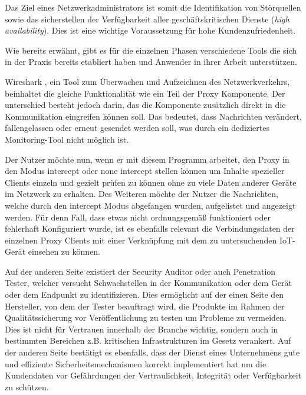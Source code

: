     Das Ziel eines Netzwerkadministrators ist somit die Identifikation von Störquellen sowie das sicherstellen der Verfügbarkeit aller geschäftskritischen Dienste (\emph{high availability}). Dies ist eine wichtige Voraussetzung für hohe Kundenzufriedenheit.
    
    Wie bereits erwähnt, gibt es für die einzelnen Phasen verschiedene Tools die sich in der Praxis bereits etabliert haben und Anwender in ihrer Arbeit unterstützen.
    
    Wireshark \cite{SandersChris2017Ppa}, ein Tool zum Überwachen und Aufzeichnen des Netzwerkverkehrs, beinhaltet die gleiche Funktionalität wie ein Teil der Proxy Komponente. Der unterschied besteht jedoch darin, das die Komponente zusätzlich direkt in die Kommunikation eingreifen können soll. Das bedeutet, dass Nachrichten verändert, fallengelassen oder erneut gesendet werden soll, was durch ein dediziertes Monitoring-Tool nicht möglich ist.
    
    Der Nutzer möchte nun, wenn er mit diesem Programm arbeitet, den Proxy in den Modus \glqq intercept\grqq{} oder \glqq none intercept\grqq{} stellen können um Inhalte spezieller Clients einzeln und gezielt prüfen zu können ohne zu viele Daten anderer Geräte im Netzwerk zu erhalten.
    Des Weiteren möchte der Nutzer die Nachrichten, welche durch den \glqq intercept\grqq{} Modus abgefangen wurden, aufgelistet und angezeigt werden.
    Für denn Fall, dass etwas nicht ordnungsgemäß funktioniert oder fehlerhaft Konfiguriert wurde, ist es ebenfalls relevant die Verbindungsdaten der einzelnen Proxy Clients mit einer Verknüpfung mit dem zu untersuchenden \ac{IoT}-Gerät einsehen zu können.
    
    Auf der anderen Seite existiert der Security Auditor oder auch Penetration Tester, welcher versucht Schwachstellen in der Kommunikation oder dem Gerät oder dem Endpunkt zu identifizieren.
    Dies ermöglicht auf der einen Seite den Hersteller, von dem der Tester beauftragt wird, die Produkte im Rahmen der Qualitätssicherung vor Veröffentlichung zu testen um Probleme zu vermeiden. Dies ist nicht für Vertrauen innerhalb der Branche wichtig, sondern auch in bestimmten Bereichen z.B. kritischen Infrastrukturen im Gesetz verankert.
    Auf der anderen Seite bestätigt es ebenfalls, dass der Dienst eines Unternehmens gute und effiziente Sicherheitsmechanismen korrekt implementiert hat um die Kundendaten vor Gefährdungen der Vertraulichkeit, Integrität oder Verfügbarkeit zu schützen.
    
